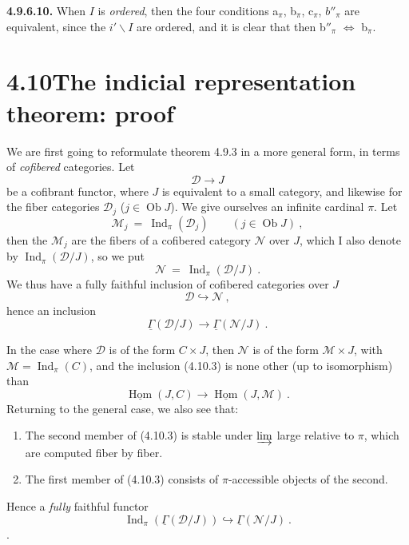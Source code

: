 \documentclass[11pt]{article}
\newcommand{\msp}[1]{\marginpar{\footnotesize [#1]}}
\newcommand{\uGamma}{\underline{\Gamma}}
\newcommand{\Ind}{\operatorname{Ind}}
\newcommand{\Ob}{\operatorname{Ob}}
\begin{document}
\textbf{4.9.6.10.} When $I$ is \textit{ordered}, then the four conditions a$_\pi$, b$_\pi$, c$_\pi$, $b''_\pi$ are equivalent, since the $i'\backslash I$ are ordered, and it is clear that then b$''_\pi$ $\Longleftrightarrow$ b$_\pi$. %

\msp{page 243}

\section*{4.10\quad The indicial representation theorem: proof}

We are first going to reformulate theorem 4.9.3 in a more general form, in terms of \textit{cofibered} categories. Let
\[
\mathcal{D} \longrightarrow J \tag*{(4.10.1)}
\]
be a cofibrant functor, where $J$ is equivalent to a small category, and likewise for the fiber categories $\mathcal{D}_j$ ($j \in \Ob J$). We give ourselves an infinite cardinal $\pi$. Let
\[
\mathcal{M}_j \ = \ \Ind_\pi(\mathcal{D}_j) \qquad (j \in \Ob J) \ , \tag*{(4.10.2)}
\]
then the $\mathcal{M}_j$ are the fibers of a cofibered category $\mathcal{N}$ over $J$, which I also denote by $\Ind_\pi(\mathcal{D}/J)$, so we put
\[
\mathcal{N} \ = \ \Ind_\pi(\mathcal{D}/J) \ . \tag*{(4.10.3)}
\]
We thus have a fully faithful inclusion of cofibered categories over $J$
\[
\mathcal{D} \hookrightarrow \mathcal{N} \ ,
\]
hence an inclusion
\[
\uGamma(\mathcal{D}/J) \longrightarrow \uGamma(\mathcal{N}/J) \ . \tag*{(4.10.4)}
\]

\msp{page 244}
In the case where $\mathcal{D}$ is of the form $C \times J$, then $\mathcal{N}$ is of the form $\mathcal{M} \times J$, with $\mathcal{M} = \Ind_\pi(C)$, and the inclusion (4.10.3) is none other (up to isomorphism) than
\[
\underline{\operatorname{Hom}}(J, C) \longrightarrow \underline{\operatorname{Hom}}(J, \mathcal{M}) \ .
\]
Returning to the general case, we also see that:
\begin{enumerate}[label={}, leftmargin=3em]
\item[1°)] The second member of (4.10.3) is stable under $\varinjlim$ large relative to $\pi$, which are computed fiber by fiber.
\item[2°)] The first member of (4.10.3) consists of $\pi$-accessible objects of the second.
\end{enumerate}
Hence a \textit{fully} faithful functor
\[
\Ind_\pi(\uGamma(\mathcal{D}/J)) \hookrightarrow \uGamma(\mathcal{N}/J) \ . \tag*{(4.10.4)}
\]
\setcounter{footnote}{103}%
.
\end{document}
